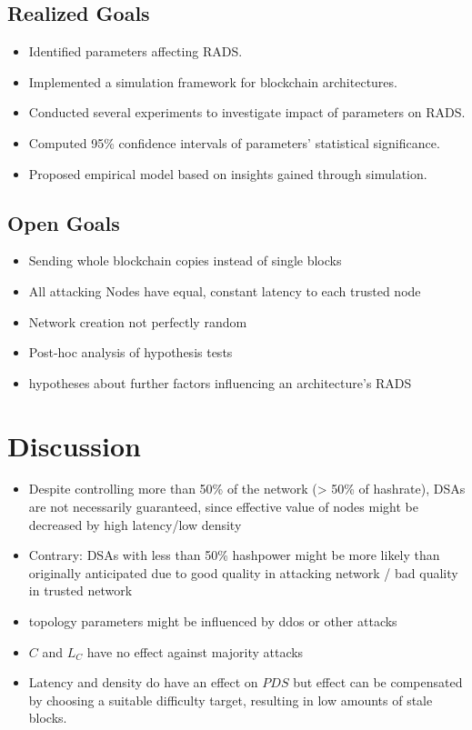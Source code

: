 \documentclass[a4paper,12pt,twoside]{report}
\begin{document}
\subsection{Realized Goals}
\begin{itemize}
\item Identified parameters affecting RADS.
\item Implemented a simulation framework for blockchain architectures.
\item Conducted several experiments to investigate impact of parameters on RADS.
\item Computed 95\% confidence intervals of parameters' statistical significance.
\item Proposed empirical model based on insights gained through simulation.
\end{itemize}
\subsection{Open Goals}
\begin{itemize}
\item Sending whole blockchain copies instead of single blocks
\item All attacking Nodes have equal, constant latency to each trusted node
\item Network creation not perfectly random
\item Post-hoc analysis of hypothesis tests
\item hypotheses about further factors influencing an architecture's RADS
\end{itemize}
\section{Discussion}
\begin{itemize}
\item Despite controlling more than 50\% of the network (> 50\% of hashrate), DSAs are not necessarily guaranteed, since effective value of nodes might be decreased by high latency/low density
\item Contrary: DSAs with less than 50\% hashpower might be more likely than originally anticipated due to good quality in attacking network / bad quality in trusted network
\item topology parameters might be influenced by ddos or other attacks
\item $C$ and $L_C$ have no effect against majority attacks
\item Latency and density do have an effect on $PDS$ but effect can be compensated by choosing a suitable difficulty target, resulting in low amounts of stale blocks.
\end{itemize}
\end{document}
